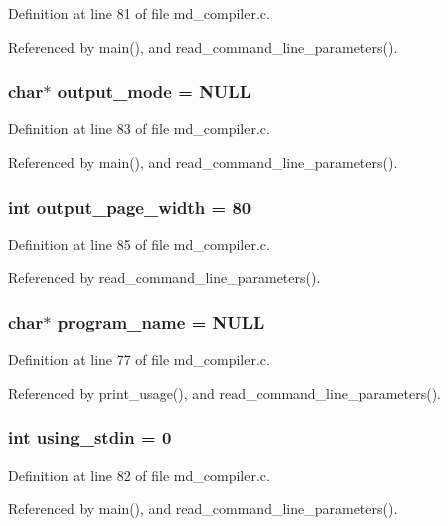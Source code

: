 Definition at line 81 of file md\_\-compiler.c.

Referenced by main(), and read\_\-command\_\-line\_\-parameters().
\subsubsection{\setlength{\rightskip}{0pt plus 5cm}char$\ast$ \bf{output\_\-mode} = \bf{NULL}}\label{md__compiler_8c_14a61661c70b91f945e8456ead9fb6c1}




Definition at line 83 of file md\_\-compiler.c.

Referenced by main(), and read\_\-command\_\-line\_\-parameters().
\subsubsection{\setlength{\rightskip}{0pt plus 5cm}int \bf{output\_\-page\_\-width} = 80}\label{md__compiler_8c_bbe586720dc5d6766839fbdc260002c1}




Definition at line 85 of file md\_\-compiler.c.

Referenced by read\_\-command\_\-line\_\-parameters().
\subsubsection{\setlength{\rightskip}{0pt plus 5cm}char$\ast$ \bf{program\_\-name} = \bf{NULL}}\label{md__compiler_8c_289c5900d90626d909f0a85d5a0ed61d}




Definition at line 77 of file md\_\-compiler.c.

Referenced by print\_\-usage(), and read\_\-command\_\-line\_\-parameters().
\subsubsection{\setlength{\rightskip}{0pt plus 5cm}int \bf{using\_\-stdin} = 0}\label{md__compiler_8c_bc340a0cfa46e3f25a4d1adab28331c0}




Definition at line 82 of file md\_\-compiler.c.

Referenced by main(), and read\_\-command\_\-line\_\-parameters().